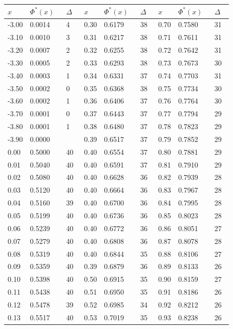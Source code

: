 \documentclass[russian, 12pt, fleqn]{article}
\begin{document}
\begin{tabular}[b]{ | l | l |  l || l | l | l || l | l | l |   }
\hline
$x\ \ \ \ \ $&$\Phi^*(x)\ \ \ $&$\Delta\ \ \ $&$x\ \ \ \ \ $&$\Phi^*(x)\ \ \ $&$\Delta\ \ \ $&$x\ \ \ \ \ $&$\Phi^*(x)\ \ \ $&$\Delta\ \ \ $\\
\hline
-3.00&0.0014&4&0.30&0.6179&38&0.70&0.7580&31\\%
-3.10&0.0010&3&0.31&0.6217&38&0.71&0.7611&31\\%
-3.20&0.0007&2&0.32&0.6255&38&0.72&0.7642&31\\%
-3.30&0.0005&2&0.33&0.6293&38&0.73&0.7673&30\\%
-3.40&0.0003&1&0.34&0.6331&37&0.74&0.7703&31\\%
 
-3.50&0.0002&0&0.35&0.6368&38&0.75&0.7734&30\\%
-3.60&0.0002&1&0.36&0.6406&37&0.76&0.7764&30\\%
-3.70&0.0001&0&0.37&0.6443&37&0.77&0.7794&29\\%
-3.80&0.0001&1&0.38&0.6480&37&0.78&0.7823&29\\%
-3.90&0.0000&  &0.39&0.6517&37&0.79&0.7852&29\\%
0.00&0.5000&40&0.40&0.6554&37&0.80&0.7881&29\\%
0.01&0.5040&40&0.40&0.6591&37&0.81&0.7910&29\\%
0.02&0.5080&40&0.40&0.6628&36&0.82&0.7939&28\\%
0.03&0.5120&40&0.40&0.6664&36&0.83&0.7967&28\\%
0.04&0.5160&39&0.40&0.6700&36&0.84&0.7995&28\\%
0.05&0.5199&40&0.40&0.6736&36&0.85&0.8023&28\\%
0.06&0.5239&40&0.40&0.6772&36&0.86&0.8051&27\\%
0.07&0.5279&40&0.40&0.6808&36&0.87&0.8078&28\\%
0.08&0.5319&40&0.40&0.6844&35&0.88&0.8106&27\\%
0.09&0.5359&40&0.39&0.6879&36&0.89&0.8133&26\\%
0.10&0.5398&40&0.50&0.6915&35&0.90&0.8159&27\\%
0.11&0.5438&40&0.51&0.6950&35&0.91&0.8186&26\\%
0.12&0.5478&39&0.52&0.6985&34&0.92&0.8212&26\\%
0.13&0.5517&40&0.53&0.7019&35&0.93&0.8238&26\\%

\end{tabular}
\end{document}
